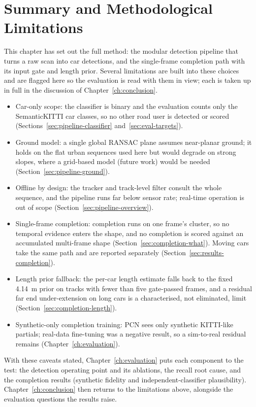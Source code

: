 \section{Summary and Methodological Limitations}
\label{sec:meth-limitations}

This chapter has set out the full method: the modular detection pipeline that turns a
raw scan into car detections, and the single-frame completion path with its input gate and
length prior. Several limitations are built into these choices and are flagged here so the
evaluation is read with them in view; each is taken up in full in the discussion of
Chapter~\ref{ch:conclusion}.

\begin{itemize}
  \item Car-only scope: the classifier is binary and the evaluation counts only the
    SemanticKITTI car classes, so no other road user is detected or scored
    (Sections~\ref{sec:pipeline-classifier} and~\ref{sec:eval-targets}).
  \item Ground model: a single global RANSAC plane assumes near-planar
    ground; it holds on the flat urban sequences used here but would degrade on
    strong slopes, where a grid-based model (future work) would be needed
    (Section~\ref{sec:pipeline-ground}).
  \item Offline by design: the tracker and track-level filter consult the
    whole sequence, and the pipeline runs far below sensor rate; real-time operation is
    out of scope (Section~\ref{sec:pipeline-overview}).
  \item Single-frame completion: completion runs on one frame's cluster, so no temporal
    evidence enters the shape, and no completion is scored against an accumulated
    multi-frame shape (Section~\ref{sec:completion-what}). Moving cars take the same path
    and are reported separately (Section~\ref{sec:results-completion}).
  \item Length prior fallback: the per-car length estimate falls back to the
    fixed \SI{4.14}{\meter} prior on tracks with fewer than five gate-passed frames, and a
    residual far end under-extension on long cars is a characterised, not eliminated, limit
    (Section~\ref{sec:completion-length}).
  \item Synthetic-only completion training: PCN sees only synthetic
    KITTI-like partials; real-data fine-tuning was a negative result, so a sim-to-real
    residual remains (Chapter~\ref{ch:evaluation}).
\end{itemize}

With these caveats stated, Chapter~\ref{ch:evaluation} puts each component to the test:
the detection operating point and its ablations, the recall root cause, and the
completion results (synthetic fidelity and independent-classifier plausibility).
Chapter~\ref{ch:conclusion} then returns to the limitations above, alongside the evaluation
questions the results raise.

